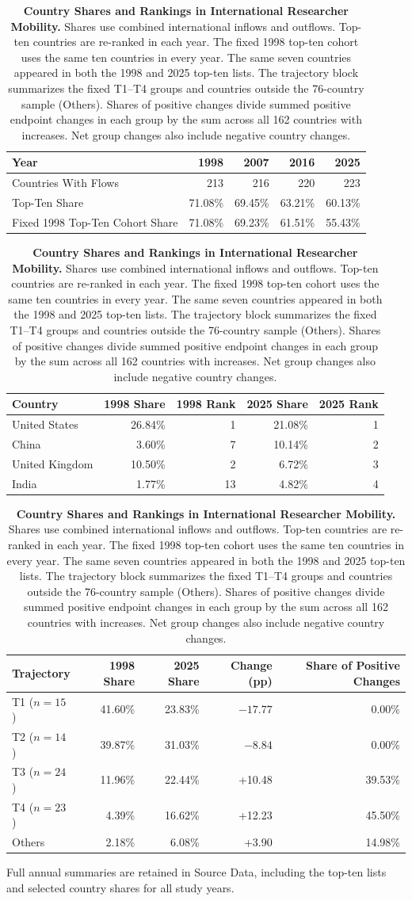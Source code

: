 \begin{table}[!htbp]
\centering
\caption{\textbf{Country Shares and Rankings in International Researcher Mobility.} Shares use combined international inflows and outflows. Top-ten countries are re-ranked in each year. The fixed 1998 top-ten cohort uses the same ten countries in every year. The same seven countries appeared in both the 1998 and 2025 top-ten lists. The trajectory block summarizes the fixed T1--T4 groups and countries outside the 76-country sample (Others). Shares of positive changes divide summed positive endpoint changes in each group by the sum across all 162 countries with increases. Net group changes also include negative country changes.}
\label{tab:national_shares}
\small
\begin{tabular}{lrrrr}
\hline
Year & 1998 & 2007 & 2016 & 2025 \\
\hline
Countries With Flows & 213 & 216 & 220 & 223 \\
Top-Ten Share & 71.08\% & 69.45\% & 63.21\% & 60.13\% \\
Fixed 1998 Top-Ten Cohort Share & 71.08\% & 69.23\% & 61.51\% & 55.43\% \\
\hline
\end{tabular}

\medskip
\begin{tabular}{lrrrr}
\hline
Country & 1998 Share & 1998 Rank & 2025 Share & 2025 Rank \\
\hline
United States & 26.84\% & 1 & 21.08\% & 1 \\
China & 3.60\% & 7 & 10.14\% & 2 \\
United Kingdom & 10.50\% & 2 & 6.72\% & 3 \\
India & 1.77\% & 13 & 4.82\% & 4 \\
\hline
\end{tabular}


\medskip
\begin{tabular}{lrrrr}
\hline
Trajectory & 1998 Share & 2025 Share & Change (pp) & Share of Positive Changes \\
\hline
T1 ($n=15$) & 41.60\% & 23.83\% & $-17.77$ & 0.00\% \\
T2 ($n=14$) & 39.87\% & 31.03\% & $-8.84$ & 0.00\% \\
T3 ($n=24$) & 11.96\% & 22.44\% & +10.48 & 39.53\% \\
T4 ($n=23$) & 4.39\% & 16.62\% & +12.23 & 45.50\% \\
Others & 2.18\% & 6.08\% & +3.90 & 14.98\% \\
\hline
\end{tabular}

\medskip
\parbox{\linewidth}{\footnotesize Full annual summaries are retained in Source Data, including the top-ten lists and selected country shares for all study years.}
\end{table}


